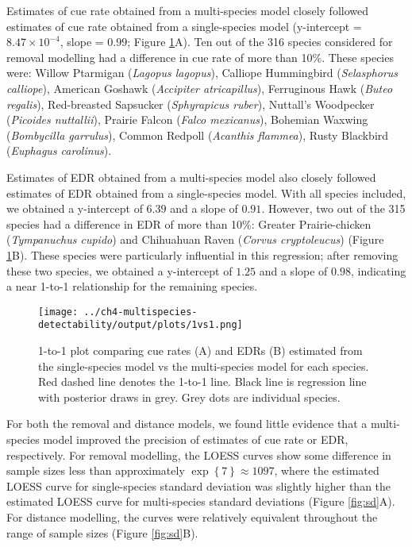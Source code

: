 \par Estimates of cue rate obtained from a multi-species model closely followed estimates of cue rate obtained from a single-species model (y-intercept = $8.47 \times 10^{-4}$, slope = $0.99$; Figure \ref{fig:1vs1}A).
Ten out of the 316 species considered for removal modelling had a difference in cue rate of more than 10\%.
These species were: Willow Ptarmigan (\textit{Lagopus lagopus}), Calliope Hummingbird (\textit{Selasphorus calliope}), American Goshawk (\textit{Accipiter atricapillus}), Ferruginous Hawk (\textit{Buteo regalis}), Red-breasted Sapsucker (\textit{Sphyrapicus ruber}), Nuttall's Woodpecker (\textit{Picoides nuttallii}), Prairie Falcon (\textit{Falco mexicanus}), Bohemian Waxwing (\textit{Bombycilla garrulus}), Common Redpoll (\textit{Acanthis flammea}), Rusty Blackbird (\textit{Euphagus carolinus}).

\par Estimates of EDR obtained from a multi-species model also closely followed estimates of EDR obtained from a single-species model. 
With all species included, we obtained a y-intercept of $6.39$ and a slope of $0.91$.
However, two out of the 315 species had a difference in EDR of more than 10\%: Greater Prairie-chicken (\textit{Tympanuchus cupido}) and Chihuahuan Raven (\textit{Corvus cryptoleucus}) (Figure \ref{fig:1vs1}B).
These species were particularly influential in this regression; after removing these two species, we obtained a y-intercept of $1.25$ and a slope of $0.98$, indicating a near 1-to-1 relationship for the remaining species.

\begin{figure}[h]
	\texttt{[image: ../ch4-multispecies-detectability/output/plots/1vs1.png]}
	\caption{1-to-1 plot comparing cue rates (A) and EDRs (B) estimated from the single-species model vs the multi-species model for each species. Red dashed line denotes the 1-to-1 line. Black line is regression line with posterior draws in grey. Grey dots are individual species.}
	\label{fig:1vs1}
\end{figure}

\par For both the removal and distance models, we found little evidence that a multi-species model improved the precision of estimates of cue rate or EDR, respectively.
For removal modelling, the LOESS curves show some difference in sample sizes less than approximately $\exp\left\{7\right\} \approx 1097$, where the estimated LOESS curve for single-species standard deviation was slightly higher than the estimated LOESS curve for multi-species standard deviations (Figure \ref{fig:sd}A).
For distance modelling, the curves were relatively equivalent throughout the range of sample sizes (Figure \ref{fig:sd}B).

